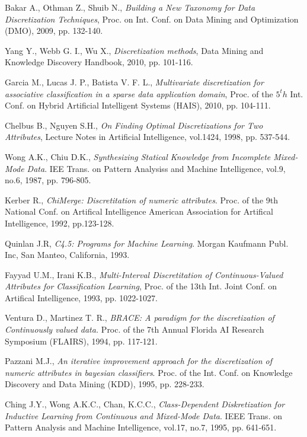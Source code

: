 \begin{thebibliography}{}
 Bakar A., Othman Z., Shuib N., \textit{Building a New Taxonomy for Data Discretization Techniques}, Proc. on Int. Conf. on Data Mining and Optimization (DMO), 2009, pp. 132-140. 

 Yang Y., Webb G. I., Wu X., \textit{Discretization methods}, Data Mining and Knowledge Discovery Handbook, 2010, pp. 101-116. 

 Garcia M., Lucas J. P., Batista V. F. L., \textit{Multivariate discretization for associative classification in a sparse data application domain}, Proc. of the $5^th$ Int. Conf. on Hybrid Artificial Intelligent Systems (HAIS), 2010, pp. 104-111. 

 Chelbus B., Nguyen S.H., \textit{On Finding Optimal Discretizations for Two Attributes}, Lecture Notes in Artificial Intelligence, vol.1424, 1998, pp. 537-544. 


Wong A.K., Chiu D.K., {\it Synthesizing Statical Knowledge from Incomplete Mixed-Mode Data}. IEE Trans. on Pattern Analysiss and Machine Intelligence, vol.9, no.6, 1987, pp. 796-805. 

Kerber R., {\it ChiMerge: Discretitation of numeric attributes}. Proc. of the 9th National Conf. on Artifical Intelligence American Association for Artifical Intelligence, 1992, pp.123-128. 

Quinlan J.R, {\it C4.5: Programs for Machine Learning}. Morgan Kaufmann Publ. Inc, San Manteo, California, 1993. 


Fayyad U.M., Irani K.B., {\it Multi-Interval Discretitation of Continuous-Valued Attributes for Classification Learning}, 
Proc. of the 13th Int. Joint Conf. on Artifical Intelligence, 1993, pp. 1022-1027. 


Ventura D., Martinez T. R., {\it BRACE: A paradigm for the discretization of Continuously valued data. } 
Proc. of the 7th Annual Florida AI Research Symposium (FLAIRS), 1994, pp. 117-121. 


Pazzani M.J., {\it An iterative improvement approach for the discretization of numeric attributes in bayesian classifiers}.
Proc. of the Int. Conf. on Knowledge Discovery and Data Mining (KDD), 1995, pp. 228-233. 


Ching J.Y., Wong A.K.C., Chan, K.C.C., {\it Class-Dependent Diskretization for Inductive Learning from Continuous and Mixed-Mode Data}.
IEEE Trans. on Pattern Analysis and Machine Intelligence, vol.17, no.7, 1995, pp. 641-651.


\end{thebibliography}
